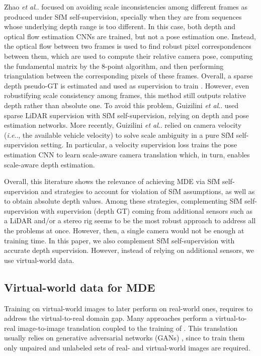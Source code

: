 \documentclass[journal]{IEEEtran}
\makeatletter
\DeclareRobustCommand\onedot{\futurelet\@let@token\@onedot}
\def\@onedot{\ifx\@let@token.\else.\null\fi\xspace}
\def\ie{\emph{i.e}\onedot} \def\Ie{\emph{I.e}\onedot}
\def\etal{\emph{et al}\onedot}
\makeatother
\begin{document}
Zhao {\etal} \cite{Zhao:2020} focused on avoiding scale inconsistencies among different frames as produced under SfM self-supervision, specially when they are from sequences whose underlying depth range is too different. In this case, both depth and optical flow estimation CNNs are trained, but not a pose estimation one. Instead, the optical flow between two frames is used to find robust pixel correspondences between them, which are used to compute their relative camera pose, computing the fundamental matrix by the 8-point algorithm, and then performing triangulation between the corresponding pixels of these frames. Overall, a sparse depth pseudo-GT is estimated and used as supervision to train  . However, even robustifying scale consistency among frames, this method still outputs relative depth rather than absolute one. To avoid this problem, Guizilini {\etal} \cite{Guizilini:2020} used sparse LiDAR supervision with SfM self-supervision, relying on depth and pose estimation networks. More recently, Guizilini {\etal} \cite{Guizilini:20203D} relied on camera velocity ({\ie}, the available vehicle velocity) to solve scale ambiguity in a pure SfM self-supervision setting. In particular, a velocity supervision loss trains the pose estimation CNN to learn scale-aware camera translation which, in turn, enables scale-aware depth estimation. 

Overall, this literature shows the relevance of achieving MDE via SfM self-supervision and strategies to account for violation of SfM assumptions, as well as to obtain absolute depth values. Among these strategies, complementing SfM self-supervision with supervision (depth GT) coming from additional sensors such as a LiDAR and/or a stereo rig seems to be the most robust approach to address all the problems at once. However, then, a single camera would not be enough at training time. In this paper, we also complement SfM self-supervision with accurate depth supervision. However, instead of relying on additional sensors, we use virtual-world data.


\subsection{Virtual-world data for MDE}
\label{sec:rw:virtual-world-MDE}

Training  on virtual-world images to later perform on real-world ones, requires to address the virtual-to-real domain gap. Many approaches perform a virtual-to-real image-to-image translation coupled to the training of . This translation usually relies on generative adversarial networks (GANs) \cite{Goodfellow:2014, Choi:2020}, since to train them only unpaired and unlabeled sets of real- and virtual-world images are required.
\end{document}
